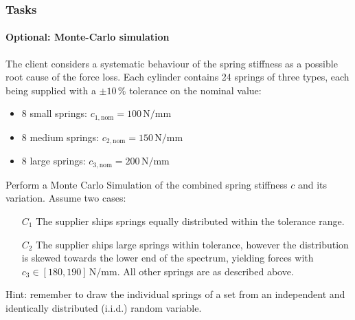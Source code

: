 \begin{frame}
    \frametitle{Tasks}
    \framesubtitle{Optional: Monte-Carlo simulation}
    The client considers a systematic behaviour of the spring stiffness as a possible root cause of the force loss. Each cylinder contains 24 springs of three types, each being supplied with a $\pm 10 \, \%$ tolerance on the nominal value:
    \begin{itemize}
        \item 8 small springs: $c_{1, \text{nom}} = 100\, \mathrm{N/mm}$
        \item 8 medium springs: $c_{2, \text{nom}} = 150\, \mathrm{N/mm}$
        \item 8 large springs: $c_{3, \text{nom}} = 200\, \mathrm{N/mm}$
    \end{itemize} 
    
    Perform a Monte Carlo Simulation of the combined spring stiffness $c$ and its variation. Assume two cases:
    \begin{itemize}
        \item[$C_1$] The supplier ships springs equally distributed within the tolerance range.
        \item[$C_2$] The supplier ships large springs within tolerance, however the distribution is skewed towards the lower end of the spectrum, yielding forces with $c_{3} \in \left[180, 190\right]\, \mathrm{N/mm}$. All other springs are as described above.
    \end{itemize}

    Hint: remember to draw the individual springs of a set from an independent and identically distributed (i.i.d.) random variable.
\end{frame}

